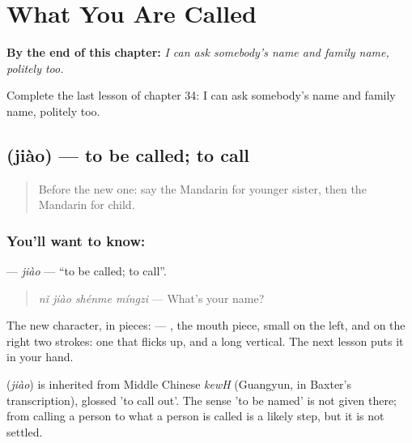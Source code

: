 
\chapter{What You Are Called}
\label{ch:zh-what-you-are-called}

\begin{chapteropening}
\textbf{By the end of this chapter:} \emph{I can ask somebody's name and family name, politely too.}

Complete the last lesson of chapter 34: I can ask somebody's name and family name, politely too.
\end{chapteropening}

\section[\texorpdfstring{\zh{叫} (jiào)}{叫 (jiào)}]{ (jiào) — to be called; to call}

\label{lesson:ZH-C34-jiao}



\begin{quote}
Before the new one: say the Mandarin for younger sister, then the Mandarin for child.
\end{quote}

\subsection*{You'll want to know: }
\textbf{} — \emph{jiào} — \textquotedblleft{}to be called; to call\textquotedblright{}.

\begin{quote}
\textbf{} \emph{nǐ jiào shénme míngzi} — What's your name?
\end{quote}

The new character, in pieces:  — , the mouth piece, small on the left, and on the right two strokes: one that flicks up, and a long vertical. The next lesson puts it in your hand.

\begin{cousinweb}
\textbf{} (\emph{jiào}) is inherited from Middle Chinese \emph{kewH} (Guangyun, in Baxter's transcription), glossed 'to call out'. The sense 'to be named' is not given there; from calling a person to what a person is called is a likely step, but it is not settled.
\end{cousinweb}

